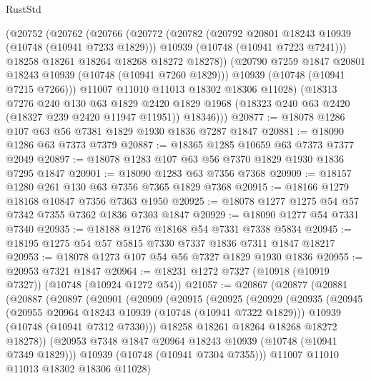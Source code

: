 \begin{lexlean}{RustStd}
\begin{coremodule}
{\begin{coremodule}
{{{{{        (@20752
          (@20762
            (@20766
              (@20772
                (@20782
                  (@20792 @20801 @18243 @10939 (@10748 (@10941 @7233 @1829)))
                  @10939
                  (@10748 (@10941 @7223 @7241)))
                @18258
                @18261
                @18264
                @18268
                @18272
                @18278))
            (@20790 @7259 @1847 @20801 @18243 @10939 (@10748 (@10941 @7260 @1829)))
            @10939
            (@10748 (@10941 @7215 @7266)))
          @11007
          @11010
          @11013
          @18302
          @18306
          @11028)
        (@18313
          @7276
          @240
          @130
          @63
          @1829
          @2420
          @1829
          @1968
          (@18323 @240 @63 @2420 (@18327 @239 @2420 @11947 @11951))
          @18346)))
@20877 := @18078 @1286 @107 @63 @56 @7381 @1829 @1930 @1836 @7287 @1847
@20881 := @18090 @1286 @63 @7373 @7379
@20887 := @18365 @1285 @10659 @63 @7373 @7377 @2049
@20897 := @18078 @1283 @107 @63 @56 @7370 @1829 @1930 @1836 @7295 @1847
@20901 := @18090 @1283 @63 @7356 @7368
@20909 := @18157 @1280 @261 @130 @63 @7356 @7365 @1829 @7368
@20915 := @18166 @1279 @18168 @10847 @7356 @7363 @1950
@20925 := @18078 @1277 @1275 @54 @57 @7342 @7355 @7362 @1836 @7303 @1847
@20929 := @18090 @1277 @54 @7331 @7340
@20935 := @18188 @1276 @18168 @54 @7331 @7338 @5834
@20945 := @18195 @1275 @54 @57 @5815 @7330 @7337 @1836 @7311 @1847 @18217
@20953 := @18078 @1273 @107 @54 @56 @7327 @1829 @1930 @1836
@20955 := @20953 @7321 @1847
@20964 := @18231 @1272 @7327 (@10918 (@10919 @7327)) (@10748 (@10924 @1272 @54))
@21057 := @20867
    (@20877
      (@20881
        (@20887
          (@20897
            (@20901
              (@20909
                (@20915
                  (@20925
                    (@20929
                      (@20935
                        (@20945
                          (@20955 @20964 @18243 @10939 (@10748 (@10941 @7322 @1829)))
                          @10939
                          (@10748 (@10941 @7312 @7330)))
                        @18258
                        @18261
                        @18264
                        @18268
                        @18272
                        @18278))
                    (@20953 @7348 @1847 @20964 @18243 @10939 (@10748 (@10941 @7349 @1829)))
                    @10939
                    (@10748 (@10941 @7304 @7355)))
                  @11007
                  @11010
                  @11013
                  @18302
                  @18306
                  @11028)
}}}}}
\end{coremodule}}
\end{coremodule}
\end{lexlean}
